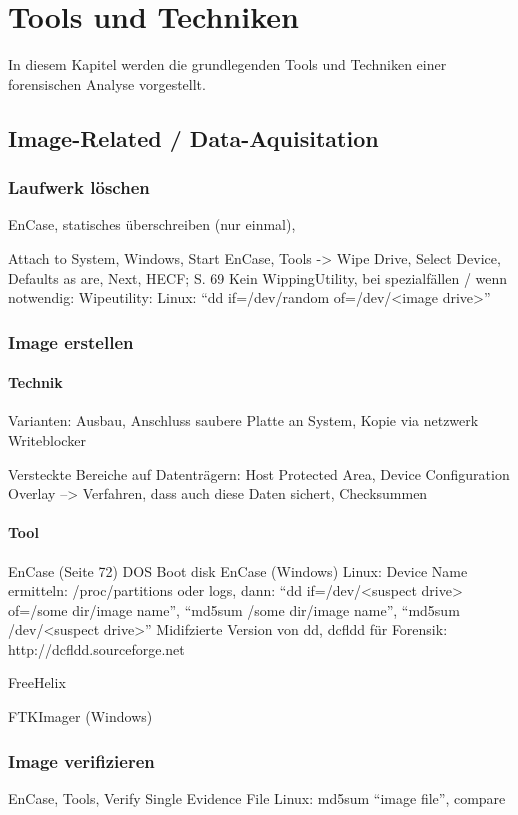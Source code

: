 \chapter{Tools und Techniken} \label{chap:ToolsTechniques}
In diesem Kapitel werden die grundlegenden Tools und Techniken einer forensischen Analyse vorgestellt. 


\section{Image-Related / Data-Aquisitation}
\subsection{Laufwerk löschen}
EnCase, statisches überschreiben (nur einmal), 

Attach to System, Windows, Start EnCase, Tools -> Wipe Drive, Select Device, Defaults as are, Next, HECF; S. 69
Kein WippingUtility, bei spezialfällen / wenn notwendig: Wipeutility: Linux: "`dd if=/dev/random of=/dev/<image drive>"'


\subsection{Image erstellen}

\subsubsection{Technik}
Varianten: Ausbau, Anschluss saubere Platte an System, Kopie via netzwerk
Writeblocker

Versteckte Bereiche auf Datenträgern: Host Protected Area, Device Configuration Overlay --> Verfahren, dass auch diese Daten sichert, Checksummen

\subsubsection{Tool}
EnCase (Seite 72) DOS Boot disk
EnCase (Windows)
Linux: Device Name ermitteln: /proc/partitions oder logs, dann: "`dd if=/dev/<suspect drive> of=/some dir/image name"', "`md5sum /some dir/image name"', "`md5sum /dev/<suspect drive>"'
Midifzierte Version von dd, dcfldd für Forensik: http://dcfldd.sourceforge.net

FreeHelix

FTKImager (Windows)

\subsection{Image verifizieren}
EnCase, Tools, Verify Single Evidence File
Linux: md5sum "`image file"', compare


